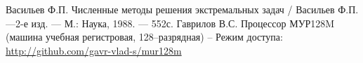 \documentclass[12pt,a4paper,oneside]{report}
\begin{document}
\renewcommand{\bibname}{Список литературы}
\begin{thebibliography}{99}
 Васильев Ф.П. Численные методы решения экстремальных задач / Васильев Ф.П. ---2-е изд. --- М.: Наука, 1988. --- 552с.
 Гаврилов В.С. Процессор МУР128M (машина учебная регистровая, 128--разрядная) -- Режим доступа: \url{http://github.com/gavr-vlad-s/mur128m}
\end{thebibliography}  
\end{document}
